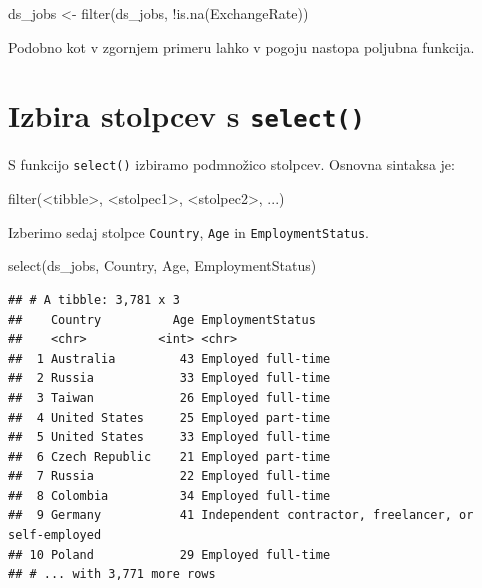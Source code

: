 \documentclass[
]{book}
\newenvironment{Shaded}{\begin{snugshade}}{\end{snugshade}}
\newcommand{\FunctionTok}[1]{\textcolor[rgb]{0.00,0.00,0.00}{#1}}
\newcommand{\NormalTok}[1]{#1}
\newcommand{\OtherTok}[1]{\textcolor[rgb]{0.56,0.35,0.01}{#1}}
\newcommand{\SpecialCharTok}[1]{\textcolor[rgb]{0.00,0.00,0.00}{#1}}
\begin{document}
\begin{Shaded}
\begin{Highlighting}[]
\NormalTok{ds\_jobs }\OtherTok{\textless{}{-}} \FunctionTok{filter}\NormalTok{(ds\_jobs, }\SpecialCharTok{!}\FunctionTok{is.na}\NormalTok{(ExchangeRate))}
\end{Highlighting}
\end{Shaded}

Podobno kot v zgornjem primeru lahko v pogoju nastopa poljubna funkcija.

\hypertarget{izbira-stolpcev-s-select}{%
\section{\texorpdfstring{Izbira stolpcev s \texttt{select()}}{Izbira stolpcev s select()}}\label{izbira-stolpcev-s-select}}

S funkcijo \texttt{select()} izbiramo podmnožico stolpcev. Osnovna sintaksa je:

\begin{Shaded}
\begin{Highlighting}[]
\FunctionTok{filter}\NormalTok{(}\SpecialCharTok{\textless{}}\NormalTok{tibble}\SpecialCharTok{\textgreater{}}\NormalTok{, }\SpecialCharTok{\textless{}}\NormalTok{stolpec1}\SpecialCharTok{\textgreater{}}\NormalTok{, }\SpecialCharTok{\textless{}}\NormalTok{stolpec2}\SpecialCharTok{\textgreater{}}\NormalTok{, ...)}
\end{Highlighting}
\end{Shaded}

Izberimo sedaj stolpce \texttt{Country}, \texttt{Age} in \texttt{EmploymentStatus}.

\begin{Shaded}
\begin{Highlighting}[]
\FunctionTok{select}\NormalTok{(ds\_jobs, Country, Age, EmploymentStatus)}
\end{Highlighting}
\end{Shaded}

\begin{verbatim}
## # A tibble: 3,781 x 3
##    Country          Age EmploymentStatus                                    
##    <chr>          <int> <chr>                                               
##  1 Australia         43 Employed full-time                                  
##  2 Russia            33 Employed full-time                                  
##  3 Taiwan            26 Employed full-time                                  
##  4 United States     25 Employed part-time                                  
##  5 United States     33 Employed full-time                                  
##  6 Czech Republic    21 Employed part-time                                  
##  7 Russia            22 Employed full-time                                  
##  8 Colombia          34 Employed full-time                                  
##  9 Germany           41 Independent contractor, freelancer, or self-employed
## 10 Poland            29 Employed full-time                                  
## # ... with 3,771 more rows
\end{verbatim}
\end{document}
